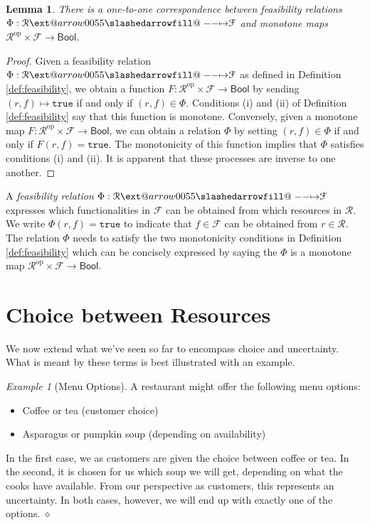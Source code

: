 \documentclass[12pt]{article}
\makeatletter
\theoremstyle{definition}
\theoremstyle{plain}
\newtheorem{lemma}[definition]{Lemma}
\theoremstyle{plain}
\theoremstyle{plain}
\theoremstyle{plain}
\theoremstyle{remark}
\newtheorem{example}[definition]{Example}
\newcommand\xqed[1]{%
	\leavevmode\unskip\penalty9999 \hbox{}\nobreak\hfill
	\quad\hbox{#1}}
\newcommand\exampleend{\xqed{$\diamond$}}
\theoremstyle{remark}
\newcommand{\mc}[1]{\mathcal{#1}}
\newcommand{\true}{\mathtt{true}}
\def\slashedarrowfill@#1#2#3#4#5{%
	$\m@th\thickmuskip0mu\medmuskip\thickmuskip\thinmuskip\thickmuskip
	\relax#5#1\mkern-7mu%
	\cleaders\hbox{$#5\mkern-2mu#2\mkern-2mu$}\hfill
	\mathclap{#3}\mathclap{#2}%
	\cleaders\hbox{$#5\mkern-2mu#2\mkern-2mu$}\hfill
	\mkern-7mu#4$%
}
\def\rightslashedarrowfill@{%
	\slashedarrowfill@\relbar\relbar\mapstochar\rightarrow}
\newcommand\xslashedrightarrow[2][]{%
	\ext@arrow 0055{\rightslashedarrowfill@}{#1}{#2}}
\makeatother
\begin{document}
\begin{lemma}
	There is a one-to-one correspondence between feasibility relations $\Phi: \mc{R} \xslashedrightarrow{} \mc{F}$ and monotone maps $\mc{R}^\text{op} \times \mc{F} \rightarrow \mathsf{Bool}$.
\end{lemma}
\begin{proof}
	Given a feasibility relation $\Phi: \mc{R} \xslashedrightarrow{} \mc{F}$ as defined in Definition \ref{def:feasibility}, we obtain a function $F: \mc{R}^\text{op} \times \mc{F} \rightarrow \mathsf{Bool}$ by sending $(r,f) \mapsto \true$ if and only if $(r,f) \in \Phi$. Conditions (i) and (ii) of Definition \ref{def:feasibility} say that this function is monotone. Conversely, given a monotone map $F: \mc{R}^\text{op} \times \mc{F} \rightarrow \mathsf{Bool}$, we can obtain a relation $\Phi$ by setting $(r,f) \in \Phi$ if and only if $F(r,f) = \true$. The monotonicity of this function implies that $\Phi$ satisfies conditions (i) and (ii). It is apparent that these processes are inverse to one another.
\end{proof}

\begin{tcolorbox}[title=Feasibility Relations, colframe=Apricot, colback = paleorange, coltitle = Sepia]
	A \emph{feasibility relation} $\Phi: \mc{R} \xslashedrightarrow{} \mc{F}$ expresses which functionalities in $\mc{F}$ can be obtained from which resources in $\mc{R}$. We write $\Phi(r,f) = \mathtt{true}$ to indicate that $f \in \mc{F}$ can be obtained from $r \in \mc{R}$. The relation $\Phi$ needs to satisfy the two monotonicity conditions in Definition \ref{def:feasibility} which can be concisely expressed by saying the $\Phi$ is a monotone map $\mc{R}^\text{op} \times \mc{F} \rightarrow \mathsf{Bool}$.
\end{tcolorbox}

\section{Choice between Resources}
We now extend what we've seen so far to encompass choice and uncertainty. What is meant by these terms is best illustrated with an example.

\begin{example}[Menu Options]\label{ex:menu}
	A restaurant might offer the following menu options:
	\begin{itemize}
		\item Coffee or tea (customer choice)
		\item Asparagus or pumpkin soup (depending on availability)
	\end{itemize}
	In the first case, we as customers are given the choice between coffee or tea. In the second, it is chosen for us which soup we will get, depending on what the cooks have available. From our perspective as customers, this represents an uncertainty. In both cases, however, we will end up with exactly one of the options. \exampleend
\end{example}
\end{document}
